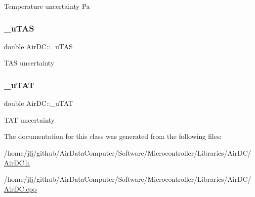 Temperature uncertainty Pa \mbox{\label{class_air_d_c_acddb83fb7c5062242da92d1d84f45766}} 
\subsubsection{\texorpdfstring{\+\_\+u\+T\+AS}{\_uTAS}}
{\footnotesize\ttfamily double Air\+D\+C\+::\+\_\+u\+T\+AS}

T\+AS uncertainty \mbox{\label{class_air_d_c_ac872626f05fed673e71d599659dcd06b}} 
\subsubsection{\texorpdfstring{\+\_\+u\+T\+AT}{\_uTAT}}
{\footnotesize\ttfamily double Air\+D\+C\+::\+\_\+u\+T\+AT}

T\+AT uncertainty 

The documentation for this class was generated from the following files\+:\begin{DoxyCompactItemize}
\item 
/home/jlj/github/\+Air\+Data\+Computer/\+Software/\+Microcontroller/\+Libraries/\+Air\+D\+C/\hyperlink{_air_d_c_8h}{Air\+D\+C.\+h}\item 
/home/jlj/github/\+Air\+Data\+Computer/\+Software/\+Microcontroller/\+Libraries/\+Air\+D\+C/\hyperlink{_air_d_c_8cpp}{Air\+D\+C.\+cpp}\end{DoxyCompactItemize}
